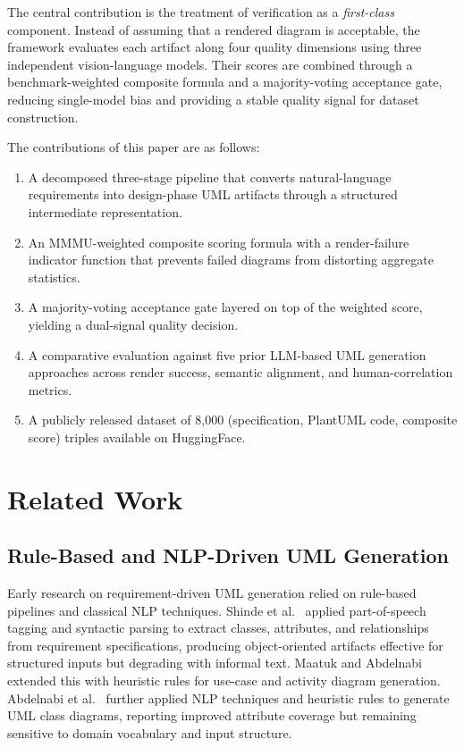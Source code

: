 \documentclass[conference]{IEEEtran}
\begin{document}
The central contribution is the treatment of verification as a
\emph{first-class} component. Instead of assuming that a rendered
diagram is acceptable, the framework evaluates each artifact along four
quality dimensions using three independent vision-language models.
Their scores are combined through a benchmark-weighted composite formula
and a majority-voting acceptance gate, reducing single-model bias and
providing a stable quality signal for dataset construction.

The contributions of this paper are as follows:
\begin{enumerate}
  \item A decomposed three-stage pipeline that converts natural-language
    requirements into design-phase UML artifacts through a structured
    intermediate representation.
  \item An MMMU-weighted composite scoring formula with a render-failure
    indicator function that prevents failed diagrams from distorting
    aggregate statistics.
  \item A majority-voting acceptance gate layered on top of the weighted
    score, yielding a dual-signal quality decision.
  \item A comparative evaluation against five prior LLM-based UML
    generation approaches across render success, semantic alignment, and
    human-correlation metrics.
  \item A publicly released dataset of 8,000 (specification, PlantUML
    code, composite score) triples available on HuggingFace.
\end{enumerate}

\section{Related Work}

\subsection{Rule-Based and NLP-Driven UML Generation}

Early research on requirement-driven UML generation relied on rule-based
pipelines and classical NLP techniques. Shinde et
al.~\cite{shinde2012} applied part-of-speech tagging and syntactic
parsing to extract classes, attributes, and relationships from
requirement specifications, producing object-oriented artifacts
effective for structured inputs but degrading with informal text. Maatuk
and Abdelnabi~\cite{maatuk2021} extended this with heuristic rules for
use-case and activity diagram generation. Abdelnabi et
al.~\cite{abdelnabi2020} further applied NLP techniques and heuristic
rules to generate UML class diagrams, reporting improved attribute
coverage but remaining sensitive to domain vocabulary and input
structure.
\end{document}
